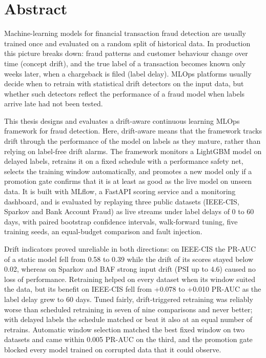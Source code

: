 \documentclass[12pt,a4paper]{report}
\begin{document}
\chapter*{Abstract}
Machine-learning models for financial transaction fraud detection are usually trained once and evaluated on a random split of historical data. In production this picture breaks down: fraud patterns and customer behaviour change over time (concept drift), and the true label of a transaction becomes known only weeks later, when a chargeback is filed (label delay). MLOps platforms usually decide when to retrain with statistical drift detectors on the input data, but whether such detectors reflect the performance of a fraud model when labels arrive late had not been tested.

This thesis designs and evaluates a drift-aware continuous learning MLOps framework for fraud detection. Here, drift-aware means that the framework tracks drift through the performance of the model on labels as they mature, rather than relying on label-free drift alarms. The framework monitors a LightGBM model on delayed labels, retrains it on a fixed schedule with a performance safety net, selects the training window automatically, and promotes a new model only if a promotion gate confirms that it is at least as good as the live model on unseen data. It is built with MLflow, a FastAPI scoring service and a monitoring dashboard, and is evaluated by replaying three public datasets (IEEE-CIS, Sparkov and Bank Account Fraud) as live streams under label delays of 0 to 60 days, with paired bootstrap confidence intervals, walk-forward tuning, five training seeds, an equal-budget comparison and fault injection.

Drift indicators proved unreliable in both directions: on IEEE-CIS the PR-AUC of a static model fell from 0.58 to 0.39 while the drift of its scores stayed below 0.02, whereas on Sparkov and BAF strong input drift (PSI up to 4.6) caused no loss of performance. Retraining helped on every dataset when its window suited the data, but its benefit on IEEE-CIS fell from +0.078 to +0.010 PR-AUC as the label delay grew to 60 days. Tuned fairly, drift-triggered retraining was reliably worse than scheduled retraining in seven of nine comparisons and never better; with delayed labels the schedule matched or beat it also at an equal number of retrains. Automatic window selection matched the best fixed window on two datasets and came within 0.005 PR-AUC on the third, and the promotion gate blocked every model trained on corrupted data that it could observe.
\end{document}
